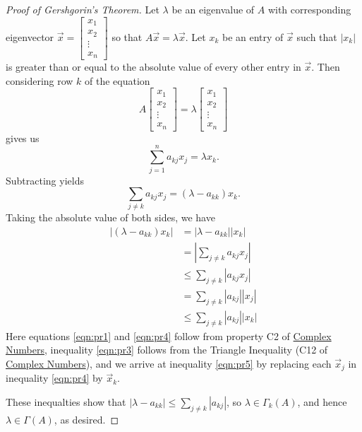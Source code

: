 \documentclass{ximera}
\begin{document}
\begin{proof}[Proof of Gershgorin's Theorem]
Let $\lambda$ be an eigenvalue of $A$ with corresponding eigenvector $\vec{x}=\begin{bmatrix}
x_1 \\ x_2 \\ \vdots \\ x_n
\end{bmatrix}$ so that $A\vec{x}=\lambda\vec{x}$. Let $x_k$ be an entry of $\vec{x}$ such that $|x_k|$ is greater than or equal to the absolute value of every other entry in $\vec{x}$.  Then considering row $k$ of the equation $$A\begin{bmatrix}
x_1 \\ x_2 \\ \vdots \\ x_n
\end{bmatrix}=\lambda\begin{bmatrix}
x_1 \\ x_2 \\ \vdots \\ x_n
\end{bmatrix}$$ gives us 
$$\sum_{j=1}^n a_{kj} x_j = \lambda x_k.$$
Subtracting yields 
$$\sum_{j\ne k} a_{kj} x_j = (\lambda - a_{kk}) x_k.$$
Taking the absolute value of both sides, we have
\begin{align}
    |(\lambda - a_{kk})x_k| &= |\lambda - a_{kk}| |x_k|\label{eqn:pr1} \\ 
    &= \left|\sum_{j\ne k} a_{kj} x_j\right| \label{eqn:pr2} \\ 
    &\le \sum_{j\ne k} |a_{kj} x_j| \label{eqn:pr3} \\ 
    &= \sum_{j\ne k} |a_{kj}| |x_j| \label{eqn:pr4}\\ 
    &\le \sum_{j\ne k} |a_{kj}| |x_k| \label{eqn:pr5}
\end{align}
Here equations \ref{eqn:pr1} and \ref{eqn:pr4} follow from property C2 of %
\href{https://ximera.osu.edu/oerlinalg/LinearAlgebra/APX-0020/main}{Complex Numbers}, inequality \ref{eqn:pr3} follows from the Triangle Inequality (C12 of %
\href{https://ximera.osu.edu/oerlinalg/LinearAlgebra/APX-0020/main}{Complex Numbers}), and we arrive at inequality \ref{eqn:pr5} by replacing each $\vec{x}_j$ in inequality \ref{eqn:pr4} by $\vec{x}_k$.

These inequalties show that $|\lambda - a_{kk}| \le \sum_{j\ne k} |a_{kj}|$, so $\lambda \in \Gamma_k(A)$, and hence $\lambda \in \Gamma(A)$, as desired.

\end{proof}
\end{document}
